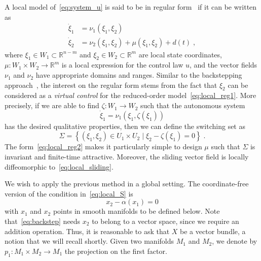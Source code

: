 \documentclass{article}
\theoremstyle{definition}
\theoremstyle{remark}
\newcommand{\MA}{X}	%
\newcommand{\NE}{U}	%
\newcommand{\RR}{\mathbb{R}}	%
\begin{document}
A local model of~\eqref{eq:system_u} is said to be in regular form~\cite{lukyanov1981,utkin} if it can be written as
\begin{subequations} \label{eq:local_reg}
\begin{align}
 \dot{\xi}_1 &= \nu_1(\xi_1,\xi_2) \label{eq:local_reg1} \\
 \dot{\xi}_2 &= \nu_2(\xi_1,\xi_2) + \mu(\xi_1,\xi_2)+d(t) \;, \label{eq:local_reg2}
\end{align}
\end{subequations}
where $\xi_1 \in W_1 \subset \RR^{n-m}$ and $\xi_2 \in W_2 \subset \RR^{m}$ are local state coordinates, 
$\mu : W_1\times W_2 \to \RR^m$ is a local expression for the control law $u$, and the vector fields $\nu_1$ and $\nu_2$
have appropriate domains and ranges. Similar to the backstepping approach~\cite{kokotovic1992,lozano1992}, the interest
on the regular form stems from the fact that $\xi_2$ can be considered as a \emph{virtual control} for the reduced-order
model~\eqref{eq:local_reg1}. More precisely, if we are able to find $\zeta : W_1 \to W_2$ such that the autonomous system
\begin{equation} \label{eq:local_sliding}
 \dot{\xi}_1 = \nu_1(\xi_1,\zeta(\xi_1))
\end{equation}
has the desired qualitative properties, then we can define the switching set as
\begin{equation} \label{eq:local_S}
 \Sigma = \left\{ (\xi_1,\xi_2) \in \NE_1\times\NE_2 \mid \xi_2 - \zeta(\xi_1) = 0 \right\} \;.
\end{equation}
The form~\eqref{eq:local_reg2} makes it particularly simple to design $\mu$ such that $\Sigma$ is invariant and finite-time
attractive. Moreover, the sliding vector field is locally diffeomorphic to~\eqref{eq:local_sliding}.

We wish to apply the previous method in a global setting. The coordinate-free version of the condition in~\eqref{eq:local_S} is
\begin{equation} \label{eq:backstep}
 x_2 - \alpha(x_1) = 0
\end{equation}
with $x_1$ and $x_2$ points in smooth manifolds to be defined below. Note that~\eqref{eq:backstep} needs $x_2$ to
belong to a vector space, since we require an addition operation. Thus, it is reasonable to ask that $\MA$ be a vector bundle, a notion
that we will recall shortly. Given two manifolds $M_1$ and $M_2$, we denote by $p_1 : M_1\times M_2 \to M_1$ the projection on the first factor.
\end{document}
